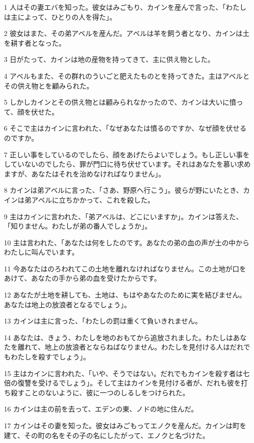 \par 1 人はその妻エバを知った。彼女はみごもり、カインを産んで言った、「わたしは主によって、ひとりの人を得た」。
\par 2 彼女はまた、その弟アベルを産んだ。アベルは羊を飼う者となり、カインは土を耕す者となった。
\par 3 日がたって、カインは地の産物を持ってきて、主に供え物とした。
\par 4 アベルもまた、その群れのういごと肥えたものとを持ってきた。主はアベルとその供え物とを顧みられた。
\par 5 しかしカインとその供え物とは顧みられなかったので、カインは大いに憤って、顔を伏せた。
\par 6 そこで主はカインに言われた、「なぜあなたは憤るのですか、なぜ顔を伏せるのですか。
\par 7 正しい事をしているのでしたら、顔をあげたらよいでしょう。もし正しい事をしていないのでしたら、罪が門口に待ち伏せています。それはあなたを慕い求めますが、あなたはそれを治めなければなりません」。
\par 8 カインは弟アベルに言った、「さあ、野原へ行こう」。彼らが野にいたとき、カインは弟アベルに立ちかかって、これを殺した。
\par 9 主はカインに言われた、「弟アベルは、どこにいますか」。カインは答えた、「知りません。わたしが弟の番人でしょうか」。
\par 10 主は言われた、「あなたは何をしたのです。あなたの弟の血の声が土の中からわたしに叫んでいます。
\par 11 今あなたはのろわれてこの土地を離れなければなりません。この土地が口をあけて、あなたの手から弟の血を受けたからです。
\par 12 あなたが土地を耕しても、土地は、もはやあなたのために実を結びません。あなたは地上の放浪者となるでしょう」。
\par 13 カインは主に言った、「わたしの罰は重くて負いきれません。
\par 14 あなたは、きょう、わたしを地のおもてから追放されました。わたしはあなたを離れて、地上の放浪者とならねばなりません。わたしを見付ける人はだれでもわたしを殺すでしょう」。
\par 15 主はカインに言われた、「いや、そうではない。だれでもカインを殺す者は七倍の復讐を受けるでしょう」。そして主はカインを見付ける者が、だれも彼を打ち殺すことのないように、彼に一つのしるしをつけられた。
\par 16 カインは主の前を去って、エデンの東、ノドの地に住んだ。
\par 17 カインはその妻を知った。彼女はみごもってエノクを産んだ。カインは町を建て、その町の名をその子の名にしたがって、エノクと名づけた。
